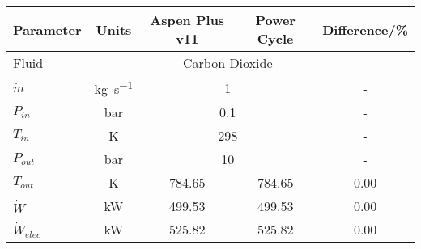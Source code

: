 \begin{tabular}{|p{2.5cm} c c c c|}
    \hline
    \rowcolor{bluepoli!40} %
    \textbf{Parameter} & \textbf{Units} & \textbf{Aspen Plus v11} & \textbf{Power Cycle} & \textbf{Difference/\unit{\percent}} \T\B \\
    \hline \hline
    Fluid  & - & \multicolumn{2}{c}{Carbon Dioxide} & - \T\B\\
    \(\Dot{m}\)  & \unit{\kg\per\s} & \multicolumn{2}{c}{\num{1}} & - \T\B\\
    \(P_{in}\) & \unit{\bar} & \multicolumn{2}{c}{\num{0.1}} & - \T\B\\
    \(T_{in}\) & \unit{\K} & \multicolumn{2}{c}{\num{298}} & - \T\B\\
    \(P_{out}\) & \unit{\bar} & \multicolumn{2}{c}{\num{10}} & - \T\B\\   
    \hline\hline
    \(T_{out}\) & \unit{\K} & 784.65 & 784.65 & 0.00 \T\B\\
    \(\Dot{W}\) & \unit{\kilo\watt} & 499.53 & 499.53 & 0.00 \T\B\\
    \(\Dot{W}_{elec}\) & \unit{\kilo\watt} & 525.82 & 525.82 & 0.00 \T\B\\
    \hline
\end{tabular}